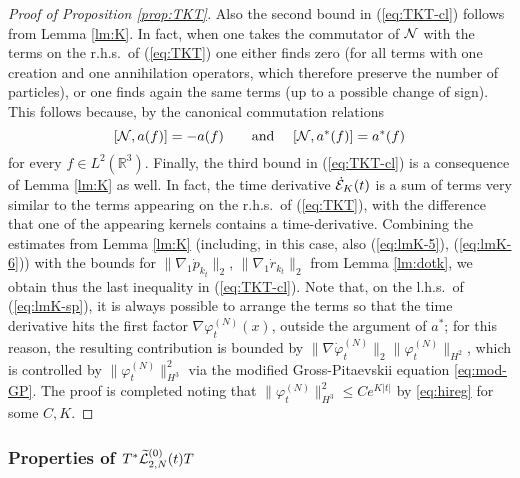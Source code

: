\documentclass[11pt,a4paper]{article}
\newcommand{\ekt}{e^{K\lvert t\rvert}}	%
\newcommand{\bR}{{\mathbb R}}
\newcommand{\wt}{\widetilde}
\newcommand{\cE}{{\cal E}}
\newcommand{\cL}{{\cal L}}
\newcommand{\cN}{{\cal N}}
\newcommand{\norm}[1]{\lVert#1\rVert}	%
\newcommand{\ph}{\varphi_t^{(N)}}	%
\begin{document}
\begin{proof}[Proof of Proposition \ref{prop:TKT}]
Also the second bound in (\ref{eq:TKT-cl}) follows from Lemma \ref{lm:K}. In fact, when one takes the commutator of $\cN$ with the terms on the r.h.s.\ of (\ref{eq:TKT}) one either finds zero (for all terms with one creation and one annihilation operators, which therefore preserve the number of particles), or one finds again the same terms (up to a possible change of sign). This follows because, by the canonical commutation relations
\[ [ \cN , a (f) ] = - a (f) \qquad \text{and } \quad [\cN , a^* (f)] = a^* (f) \]
for every $f \in L^2 (\bR^3)$. Finally, the third bound in (\ref{eq:TKT-cl})
is a consequence of Lemma \ref{lm:K} as well. In fact, the time derivative
$\dot{\cE}_K (t)$ is a sum of terms very similar to the terms appearing on
the r.h.s.\ of (\ref{eq:TKT}), with the difference that one of the appearing
kernels contains a time-derivative. Combining the estimates from Lemma
\ref{lm:K} (including, in this case, also (\ref{eq:lmK-5}),
(\ref{eq:lmK-6})) with the bounds for $\| \nabla_1 \dot{p}_{k_t} \|_2$, $\|
\nabla_1 \dot{r}_{k_t} \|_2$ from Lemma \ref{lm:dotk}, we obtain thus the
last inequality in (\ref{eq:TKT-cl}). Note that, on the l.h.s.\ of
(\ref{eq:lmK-sp}), it is always possible to arrange the terms so that the
time derivative hits the first factor $\nabla \varphi_t^{(N)} (x)$, outside
the argument of $a^*$; for this reason, the resulting contribution is
bounded by $\| \nabla \dot{\varphi}_t^{(N)} \|_2 \| \varphi_t^{(N)}
\|_{H^2}$, which is controlled by $\| \varphi_t^{(N)}\|_{H^3}^2$ via the
modified Gross-Pitaevskii equation \eqref{eq:mod-GP}. The proof is completed
noting that $\norm{\ph}_{H^3}^2 \leq C \ekt$ by \eqref{eq:hireg} for some $C,K$. 
\end{proof}

\subsubsection{Properties of $T^* \wt{\cL}_{2,N}^{(0)} (t) T$}
\end{document}
